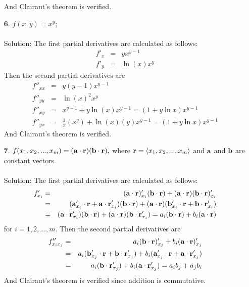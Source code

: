 \documentclass[12pt]{amsbook}
\newcommand{\la}{\langle}
\newcommand{\ra}{\rangle}
\begin{document}
\begin{enumerate}
And Clairaut's theorem is verified.
\\
\item[{\small\bf 6}.] $f(x,y)=x^y$;
\\
\\
{\sc Solution}: The first partial derivatives are calculated as follows:
\begin{eqnarray*}
f'_x&=&yx^{y-1} \\
f'_y&=&\ln(x)x^y 
\end{eqnarray*}
Then the second partial derivatives are
\begin{eqnarray*}
f''_{xx}&=&y(y-1)x^{y-1} \\
f''_{yy}&=&\ln(x)^2x^{y} \\
f''_{xy}&=&x^{y-1}+y\ln(x)x^{y-1}=(1+y\ln x)x^{y-1} \\
f''_{yx}&=& \frac{1}{x}(x^y)+\ln(x)(y)x^{y-1}=(1+y\ln x)x^{y-1}
\end{eqnarray*}
And Clairaut's theorem is verified.
\\
\item[{\small\bf 7}.] $f(x_1,x_2,...,x_m)=({\bf a}\cdot{\bf r})({\bf b}\cdot{\bf r}),$ where ${\bf r}=\la x_1,x_2,...,x_m \ra$ and ${\bf a}$ and ${\bf b}$ are constant vectors.
\\
\\
{\sc Solution}: The first partial derivatives are calculated as follows:
\begin{eqnarray*}
f'_{x_i}&=& ({\bf a}\cdot{\bf r})'_{x_i}({\bf b}\cdot{\bf r})+({\bf a}\cdot{\bf r})({\bf b}\cdot{\bf r})'_{x_i} \\
&=&({\bf a}'_{x_i}\cdot{\bf r}+{\bf a}\cdot{\bf r}'_{x_i})({\bf b}\cdot{\bf r})+({\bf a}\cdot{\bf r})({\bf b}'_{x_i}\cdot{\bf r}+{\bf b}\cdot{\bf r}'_{x_i}) \\
&=&({\bf a}\cdot{\bf r}'_{x_i})({\bf b}\cdot{\bf r})+({\bf a}\cdot{\bf r})({\bf b}\cdot{\bf r}'_{x_i})=a_i({\bf b}\cdot{\bf r})+b_i({\bf a}\cdot{\bf r}) 
\end{eqnarray*}
for $i=1,2,...,m$. 
Then the second partial derivatives are
\begin{eqnarray*}
f''_{x_ix_j}&=&a_i({\bf b}\cdot{\bf r})'_{x_j}+b_i({\bf a}\cdot{\bf r})'_{x_j} \\
&=&a_i({\bf b}'_{x_j}\cdot{\bf r}+{\bf b}\cdot{\bf r}'_{x_j})+b_i({\bf a}'_{x_j}\cdot{\bf r}+{\bf a}\cdot{\bf r}'_{x_j}) \\
&=&a_i({\bf b}\cdot{\bf r}'_{x_j})+b_i({\bf a}\cdot{\bf r}'_{x_j}) = a_ib_j+a_jb_i
\end{eqnarray*}
And Clairaut's theorem is verified since addition is commutative.
\\
\end{enumerate}
\end{document}
